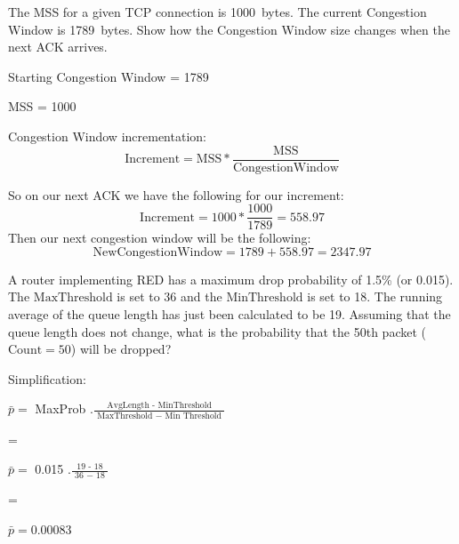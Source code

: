 \documentclass[12pt,addpoints,answers]{exam}
\begin{document}
\begin{questions}
\question[6] The MSS for a given TCP connection is \SI{1000}{bytes}. The current Congestion Window is \SI{1789}{bytes}. Show how the Congestion Window size changes when the next ACK arrives.
\begin{solution}[3in]
	\begin{center}
		Starting Congestion Window = 1789
		
		MSS = 1000
		
		Congestion Window incrementation:
		 \begin{equation}
		 	\mathrm{Increment} = \mathrm{MSS} * \frac{\mathrm{MSS}}{\mathrm{CongestionWindow}}
		 \end{equation}
		 
		 So on our next ACK we have the following for our increment:
		 \begin{equation}
		 	\mathrm{Increment} = \mathrm{1000} * \frac{\mathrm{1000}}{\mathrm{1789}} = 558.97
		 \end{equation}
		 Then our next congestion window will be the following:
		 \begin{equation}
		 	\mathrm{New Congestion Window} = \mathrm{1789} + \mathrm{558.97} = 2347.97
		 \end{equation}
	\end{center}
\end{solution}


\question[6] A router implementing RED has a maximum drop probability of 1.5\% (or 0.015). The $\mathrm{MaxThreshold}$ is set to 36 and the $\mathrm{MinThreshold}$ is set to 18. The running average of the queue length has just been calculated to be 19. Assuming that the queue length does not change, what is the probability that the 50th packet ($\mathrm{Count} = 50$) will be dropped?
\begin{solution}[3in]
Simplification:
\begin{center}
	$\bar{p}=$ MaxProb $. \frac{\text { AvgLength - MinThreshold }}{\text { MaxThreshold }-\text { Min Threshold }}$
	
	=
	
	$\bar{p}=$ 0.015 $. \frac{\text { 19 - 18 }}{\text { 36 }-\text { 18 }}$

	=
	
	$\bar{p}= 0.00083$
\end{center}


\end{solution}
\end{questions}
\end{document}

